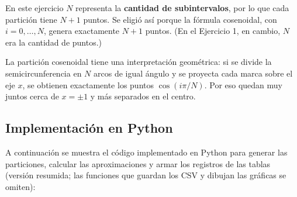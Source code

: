 En este ejercicio \(N\) representa la \textbf{cantidad de subintervalos}, por lo que cada partición tiene \(N+1\) puntos. Se eligió así porque la fórmula cosenoidal, con \(i=0,\ldots,N\), genera exactamente \(N+1\) puntos. (En el Ejercicio 1, en cambio, \(N\) era la cantidad de puntos.)

La partición cosenoidal tiene una interpretación geométrica: si se divide la semicircunferencia en \(N\) arcos de igual ángulo y se proyecta cada marca sobre el eje \(x\), se obtienen exactamente los puntos \(\cos(i\pi/N)\). Por eso quedan muy juntos cerca de \(x=\pm1\) y más separados en el centro.

\subsection{Implementación en Python}

A continuación se muestra el código implementado en Python para generar las particiones, calcular las aproximaciones y armar los registros de las tablas (versión resumida; las funciones que guardan los CSV y dibujan las gráficas se omiten):

